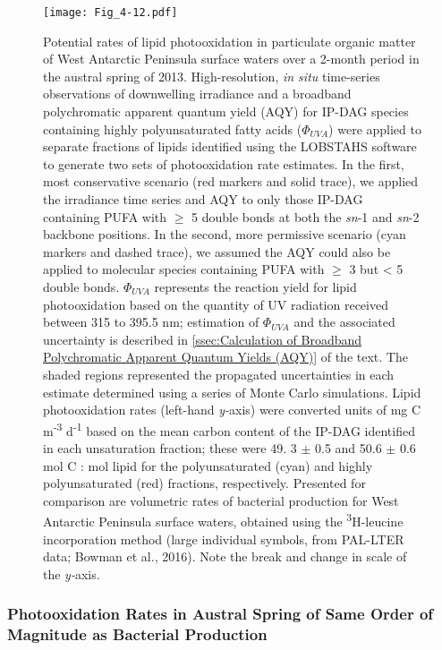 \begin{figure}[!p]
\centering
\texttt{[image: Fig\_4-12.pdf]}
\caption[Potential rates of lipid photooxidation in particulate organic matter of West Antarctic Peninsula surface waters]{Potential rates of lipid photooxidation in particulate organic matter of West Antarctic Peninsula surface waters over a 2-month period in the austral spring of 2013. High-resolution, \emph{in situ} time-series observations of downwelling irradiance and a broadband polychromatic apparent quantum yield (AQY) for IP-DAG species containing highly polyunsaturated fatty acids (${\Phi _{UVA}}$) were applied to separate fractions of lipids identified using the LOBSTAHS software to generate two sets of photooxidation rate estimates. In the first, most conservative scenario (red markers and solid trace), we applied the irradiance time series and AQY to only those IP-DAG containing PUFA with $\geq$ 5 double bonds at both the \emph{sn}-1 and \emph{sn}-2 backbone positions. In the second, more permissive scenario (cyan markers and dashed trace), we assumed the AQY could also be applied to molecular species containing PUFA with $\geq$ 3 but \textless{} 5 double bonds. ${\Phi _{UVA}}$ represents the reaction yield for lipid photooxidation based on the quantity of UV radiation received between 315 to 395.5 nm; estimation of ${\Phi _{UVA}}$ and the associated uncertainty is described in \autoref{ssec:Calculation of Broadband Polychromatic Apparent Quantum Yields (AQY)} of the text. The shaded regions represented the propagated uncertainties in each estimate determined using a series of Monte Carlo simulations. Lipid photooxidation rates (left-hand \emph{y-}axis) were converted units of mg C m\textsuperscript{-3} d\textsuperscript{-1} based on the mean carbon content of the IP-DAG identified in each unsaturation fraction; these were 49. 3 $\pm$ 0.5 and 50.6 $\pm$ 0.6 mol C : mol lipid for the polyunsaturated (cyan) and highly polyunsaturated (red) fractions, respectively. Presented for comparison are volumetric rates of bacterial production for West Antarctic Peninsula surface waters, obtained using the \textsuperscript{3}H-leucine incorporation method (large individual symbols, from PAL-LTER data; Bowman et al., 2016). Note the break and change in scale of the \emph{y-}axis.}
\label{fig:c4n12}
\end{figure}
\subsubsection{Photooxidation Rates in Austral Spring of Same Order of Magnitude as Bacterial Production}

